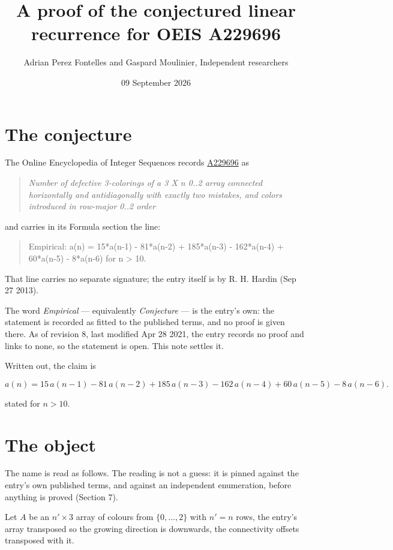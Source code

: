 \documentclass[11pt]{article}
\title{A proof of the conjectured linear recurrence for OEIS A229696}
\author{Adrian Perez Fontelles and Gaspard Moulinier, Independent researchers}
\date{09 September 2026}
\theoremstyle{definition}
\begin{document}
\maketitle
\section{The conjecture}

The Online Encyclopedia of Integer Sequences records \href{https://oeis.org/A229696}{A229696} as

\begin{quote}\itshape Number of defective 3-colorings of a 3 X n 0..2 array connected horizontally and antidiagonally with exactly two mistakes, and colors introduced in row-major 0..2 order\end{quote}

and carries in its Formula section the line:

\begin{quote}\ttfamily Empirical: a(n) = 15*a(n-1) - 81*a(n-2) + 185*a(n-3) - 162*a(n-4) + 60*a(n-5) - 8*a(n-6) for n > 10.\end{quote}

That line carries no separate signature; the entry itself is by R. H. Hardin (Sep 27 2013).

The word {\itshape Empirical} --- equivalently {\itshape Conjecture} --- is the entry's own: the statement is recorded as fitted to the published terms, and no proof is given there. As of revision 8, last modified Apr 28 2021, the entry records no proof and links to none, so the statement is open. This note settles it.

Written out, the claim is

\[a(n) = 15\,a(n-1) - 81\,a(n-2) + 185\,a(n-3) - 162\,a(n-4) + 60\,a(n-5) - 8\,a(n-6).\]

stated for $n > 10$.

\section{The object}

The name is read as follows. The reading is not a guess: it is pinned against the entry's own published terms, and against an independent enumeration, before anything is proved (Section 7).

Let $A$ be an $n' \times 3$ array of colours from $\{0,\dots,2\}$ with $n' = n$ rows, the entry's array transposed so the growing direction is downwards, the connectivity offsets transposed with it.
\end{document}
